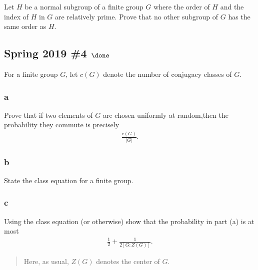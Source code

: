 Let \(H\) be a normal subgroup of a finite group \(G\) where the order
of \(H\) and the index of \(H\) in \(G\) are relatively prime. Prove
that no other subgroup of \(G\) has the same order as \(H\).


\hypertarget{spring-2019-4-done}{%
\subsection{\texorpdfstring{Spring 2019 \#4
\(\done\)}{Spring 2019 \#4 \textbackslash done}}\label{spring-2019-4-done}}

For a finite group \(G\), let \(c(G)\) denote the number of conjugacy
classes of \(G\).

\hypertarget{a}{%
\subsubsection{a}\label{a}}

Prove that if two elements of \(G\) are chosen uniformly at random,then
the probability they commute is precisely
\begin{align*}
\frac{c(G)}{{\left\lvert {G} \right\rvert}}
.\end{align*}

\hypertarget{b}{%
\subsubsection{b}\label{b}}

State the class equation for a finite group.

\hypertarget{c}{%
\subsubsection{c}\label{c}}

Using the class equation (or otherwise) show that the probability in
part (a) is at most
\begin{align*}
\frac 1 2 + \frac 1 {2[G : Z(G)]}
.\end{align*}

\begin{quote}
Here, as usual, \(Z(G)\) denotes the center of \(G\).
\end{quote}

